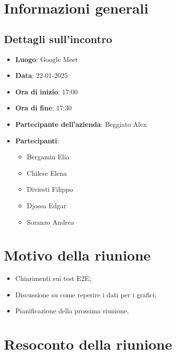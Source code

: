 \section{Informazioni generali}
\subsection{Dettagli sull'incontro}
\begin{itemize}
    \item \textbf{Luogo}: Google Meet
    \item \textbf{Data}: 22-01-2025
    \item \textbf{Ora di inizio}: 17:00
    \item \textbf{Ora di fine}: 17:30
    \item \textbf{Partecipante dell'azienda}: Beggiato Alex
    \item \textbf{Partecipanti}:
    \begin{itemize}
        \item Bergamin Elia
        \item Chilese Elena
        \item Diviesti Filippo
        \item Djossa Edgar
        \item Soranzo Andrea  
    \end{itemize}
\end{itemize}

\section{Motivo della riunione}
\begin{itemize}
    \item Chiarimenti sui test E2E;
    \item Discussione su come reperire i dati per i grafici;
    \item Pianificazione della prossima riunione.
\end{itemize}

\section{Resoconto della riunione}


